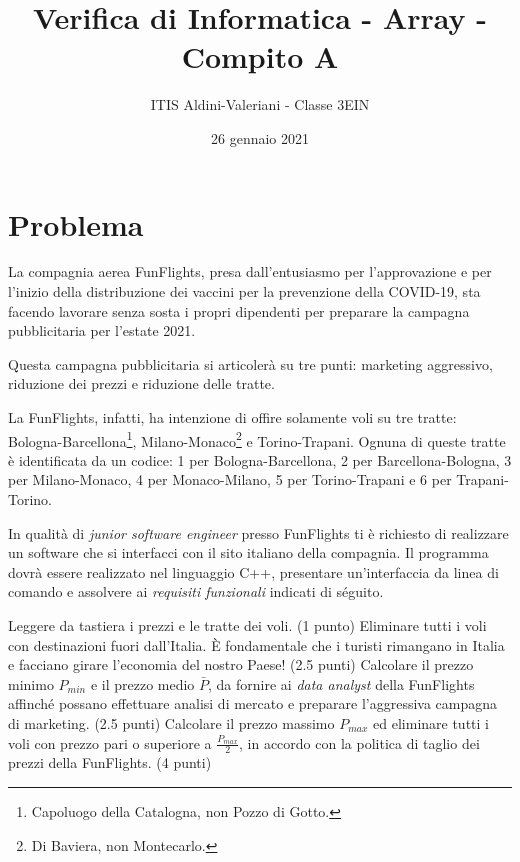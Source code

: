 \documentclass[a4paper, 11pt]{exam}
\title{Verifica di Informatica - Array - Compito A}
\author{ITIS Aldini-Valeriani - Classe 3EIN}
\date{26 gennaio 2021}
\begin{document}
\maketitle
\begin{center}

\end{center}
\vspace{1em}

\section*{Problema}

La compagnia aerea FunFlights, presa dall'entusiasmo per l'approvazione e per l'inizio della distribuzione dei vaccini per la prevenzione della COVID-19, sta facendo lavorare senza sosta i propri dipendenti per preparare la campagna pubblicitaria per l'estate 2021.

Questa campagna pubblicitaria si articolerà su tre punti: marketing aggressivo, riduzione dei prezzi e riduzione delle tratte.

La FunFlights, infatti, ha intenzione di offire solamente voli su tre tratte: Bologna-Barcellona\footnote{Capoluogo della Catalogna, non Pozzo di Gotto.}, Milano-Monaco\footnote{Di Baviera, non Montecarlo.} e Torino-Trapani.
Ognuna di queste tratte è identificata da un codice: 1 per Bologna-Barcellona, 2 per Barcellona-Bologna, 3 per Milano-Monaco, 4 per Monaco-Milano, 5 per Torino-Trapani e 6 per Trapani-Torino.

In qualità di \textit{junior software engineer} presso FunFlights ti è richiesto di realizzare un software che si interfacci con il sito italiano della compagnia.
Il programma dovrà essere realizzato nel linguaggio C++, presentare un'interfaccia da linea di comando e assolvere ai \textit{requisiti funzionali} indicati di séguito.

\begin{questions}
	\question Leggere da tastiera i prezzi e le tratte dei voli. (1 punto)
	\question Eliminare tutti i voli con destinazioni fuori dall'Italia. È fondamentale che i turisti rimangano in Italia e facciano girare l'economia del nostro Paese! (2.5 punti)
	\question Calcolare il prezzo minimo $P_{min}$ e il prezzo medio $\bar{P}$, da fornire ai \textit{data analyst} della FunFlights affinché possano effettuare analisi di mercato e preparare l'aggressiva campagna di marketing.  (2.5 punti)
	\question Calcolare il prezzo massimo $P_{max}$ ed eliminare tutti i voli con prezzo pari o superiore a $\frac{P_{max}}{2}$, in accordo con la politica di taglio dei prezzi della FunFlights. (4 punti)
\end{questions}
\end{document}
